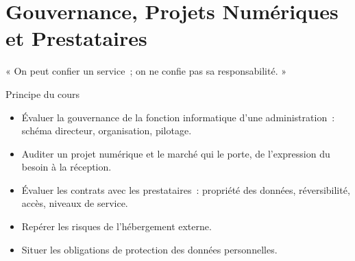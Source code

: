 
\chapter{Gouvernance, Projets Numériques et Prestataires}
\label{chap:gouvernance}

\epigraph{%
    « On peut confier un service~; on ne confie pas sa responsabilité. »%
}{Principe du cours}


\begin{boxobjectifs}
\begin{itemize}
    \item Évaluer la gouvernance de la fonction informatique d'une
          administration~: schéma directeur, organisation, pilotage.
    \item Auditer un projet numérique et le marché qui le porte, de
          l'expression du besoin à la réception.
    \item Évaluer les contrats avec les prestataires~: propriété des
          données, réversibilité, accès, niveaux de service.
    \item Repérer les risques de l'hébergement externe.
    \item Situer les obligations de protection des données personnelles.
\end{itemize}
\end{boxobjectifs}

